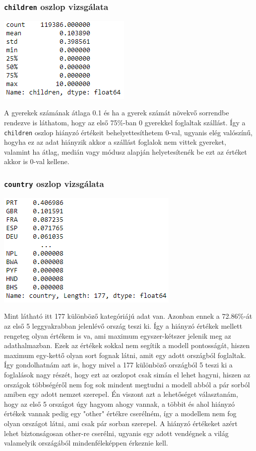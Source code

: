 \subsubsection{\texttt{children} oszlop vizsgálata}
\includegraphics{images/4.fejezet/2.adattisztitas.PNG}

A gyerekek számának átlaga 0.1 és ha a gyerek számát növekvő sorrendbe rendezve is láthatom, hogy az első 75\%-ban 0 gyerekkel foglaltak szállást. Így a \texttt{children} oszlop hiányzó értékeit behelyettesíthetem 0-val, ugyanis elég valószínű, hogyha ez az adat hiányzik akkor a szállást foglalok nem vittek gyereket, valamint ha átlag, medián vagy módusz alapján helyetesítenék be ezt az értéket akkor is 0-val kellene.

\subsubsection{\texttt{country} oszlop vizsgálata}
\includegraphics{images/4.fejezet/2.adattisztitas1.PNG}

Mint látható itt 177 különböző kategóriájú adat van. Azonban ennek a 72.86\%-át az első 5 leggyakrabban jelenlévő ország teszi ki. Így a hiányzó értékek mellett rengeteg olyan értékem is va, ami maximum egyszer-kétszer jelenik meg az adathalmazban. Ezek az értékek sokkal nem segítik a modell pontosságát, hiszen maximum egy-kettő olyan sort fognak látni, amit egy adott országból foglaltak. Így gondolhatnám azt is, hogy mivel a 177 különböző országból 5 teszi ki a foglalások nagy részét, hogy ezt az oszlopot csak simán el lehet hagyni, hiszen az országok többségéről nem fog sok mindent megtudni a modell abból a pár sorból amiben egy adott nemzet szerepel. Én viszont azt a lehetőséget választanám, hogy az első 5 országot úgy hagyom ahogy vannak, a többit és ahol hiányzó értékek vannak pedig egy "other" értékre cserélném, így a modellem nem fog olyan országot látni, ami csak pár sorban szerepel. A hiányzó értékeket azért lehet biztonságosan other-re cserélni, ugyanis egy adott vendégnek a világ valamelyik országából mindenféleképpen érkeznie kell.

